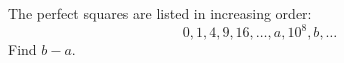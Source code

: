 The perfect squares are listed in increasing order:
\[0,1,4,9,16,\dots,a,10^8,b,\dots\]
Find $b-a$.
